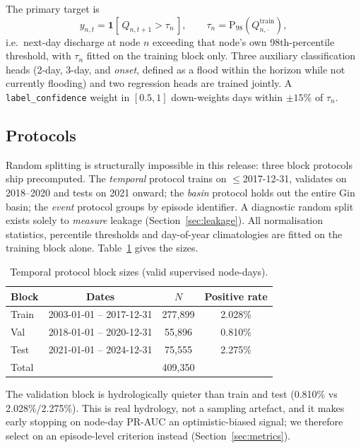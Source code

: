\documentclass[conference]{IEEEtran}
\begin{document}
The primary target is
\begin{equation}
y_{n,t} = \mathbf{1}\!\left[\, Q_{n,t+1} > \tau_n \,\right],\qquad
\tau_n = \mathrm{P}_{98}\!\left(Q_{n,\cdot}^{\text{train}}\right),
\end{equation}
i.e.\ next-day discharge at node $n$ exceeding that node's own 98th-percentile
threshold, with $\tau_n$ fitted on the training block only. Three auxiliary
classification heads (2-day, 3-day, and \emph{onset}, defined as a flood within
the horizon while not currently flooding) and two regression heads are trained
jointly. A \texttt{label\_confidence} weight in $[0.5,1]$ down-weights days
within $\pm15\%$ of $\tau_n$.

\subsection{Protocols}
\label{sec:protocol}
Random splitting is structurally impossible in this release: three block
protocols ship precomputed. The \emph{temporal} protocol trains on
$\le$2017-12-31, validates on 2018--2020 and tests on 2021 onward; the
\emph{basin} protocol holds out the entire Gin basin; the \emph{event} protocol
groups by episode identifier. A diagnostic random split exists solely to
\emph{measure} leakage (Section~\ref{sec:leakage}). All normalisation statistics,
percentile thresholds and day-of-year climatologies are fitted on the training
block alone. Table~\ref{tab:splits} gives the sizes.

\begin{table}[t]
\caption{Temporal protocol block sizes (valid supervised node-days).}
\label{tab:splits}
\centering
\footnotesize
\begin{tabular}{@{}lccc@{}}
\toprule
Block & Dates & $N$ & Positive rate \\
\midrule
Train & 2003-01-01 -- 2017-12-31 & 277{,}899 & 2.028\% \\
Val   & 2018-01-01 -- 2020-12-31 & \phantom{0}55{,}896 & 0.810\% \\
Test  & 2021-01-01 -- 2024-12-31 & \phantom{0}75{,}555 & 2.275\% \\
\midrule
Total & & 409{,}350 & \\
\bottomrule
\end{tabular}
\end{table}

The validation block is hydrologically quieter than train and test
(0.810\% vs 2.028\%/2.275\%). This is real hydrology, not a sampling artefact,
and it makes early stopping on node-day PR-AUC an optimistic-biased signal; we
therefore select on an episode-level criterion instead
(Section~\ref{sec:metrics}).
\end{document}
